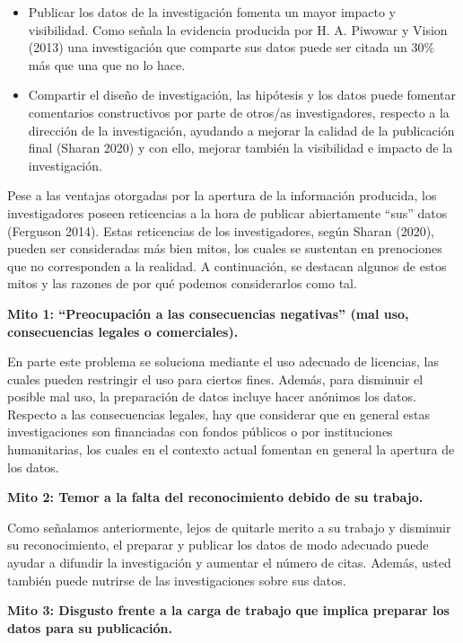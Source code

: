 \documentclass[
  spanish,
  letterpaper,
  DIV=11,
  numbers=noendperiod]{scrreprt}
\begin{document}
\begin{itemize}
  \begin{itemize}
  \item
    Publicar los datos de la investigación fomenta un mayor impacto y
    visibilidad. Como señala la evidencia producida por H. A. Piwowar y
    Vision (2013) una investigación que comparte sus datos puede ser
    citada un 30\% más que una que no lo hace.
  \item
    Compartir el diseño de investigación, las hipótesis y los datos
    puede fomentar comentarios constructivos por parte de otros/as
    investigadores, respecto a la dirección de la investigación,
    ayudando a mejorar la calidad de la publicación final (Sharan 2020)
    y con ello, mejorar también la visibilidad e impacto de la
    investigación.
  \end{itemize}
\end{itemize}

Pese a las ventajas otorgadas por la apertura de la información
producida, los investigadores poseen reticencias a la hora de publicar
abiertamente ``sus'' datos (Ferguson 2014). Estas reticencias de los
investigadores, según Sharan (2020), pueden ser consideradas más bien
mitos, los cuales se sustentan en prenociones que no corresponden a la
realidad. A continuación, se destacan algunos de estos mitos y las
razones de por qué podemos considerarlos como tal.

\textbf{Mito 1: ``Preocupación a las consecuencias negativas'' (mal uso,
consecuencias legales o comerciales).}

En parte este problema se soluciona mediante el uso adecuado de
licencias, las cuales pueden restringir el uso para ciertos fines.
Además, para disminuir el posible mal uso, la preparación de datos
incluye hacer anónimos los datos. Respecto a las consecuencias legales,
hay que considerar que en general estas investigaciones son financiadas
con fondos públicos o por instituciones humanitarias, los cuales en el
contexto actual fomentan en general la apertura de los datos.

\textbf{Mito 2: Temor a la falta del reconocimiento debido de su
trabajo.}

Como señalamos anteriormente, lejos de quitarle merito a su trabajo y
disminuir su reconocimiento, el preparar y publicar los datos de modo
adecuado puede ayudar a difundir la investigación y aumentar el número
de citas. Además, usted también puede nutrirse de las investigaciones
sobre sus datos.

\textbf{Mito 3: Disgusto frente a la carga de trabajo que implica
preparar los datos para su publicación.}
\end{document}
